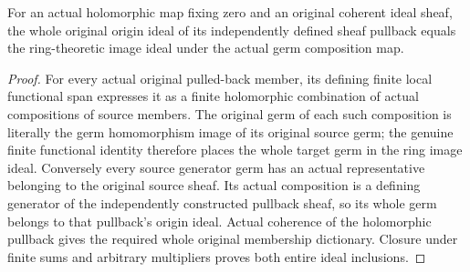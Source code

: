 \begin{theorem}
\label{hir:actual-holomorphic-whole-origin-pullback}
\leanok
For an actual holomorphic map fixing zero and an original coherent ideal
sheaf, the whole original origin ideal of its independently defined sheaf
pullback equals the ring-theoretic image ideal under the actual germ
composition map.
\end{theorem}
\begin{proof}
For every actual original pulled-back member, its defining finite local
functional span expresses it as a finite holomorphic combination of
actual compositions of source members. The original germ of each such
composition is literally the germ homomorphism image of its original
source germ; the genuine finite functional identity therefore places
the whole target germ in the ring image ideal. Conversely every source
generator germ has an actual representative belonging to the original
source sheaf. Its actual composition is a defining generator of the
independently constructed pullback sheaf, so its whole germ belongs to
that pullback's origin ideal. Actual coherence of the holomorphic
pullback gives the required whole original membership dictionary. Closure
under finite sums and arbitrary multipliers proves both entire ideal
inclusions.
\end{proof}

